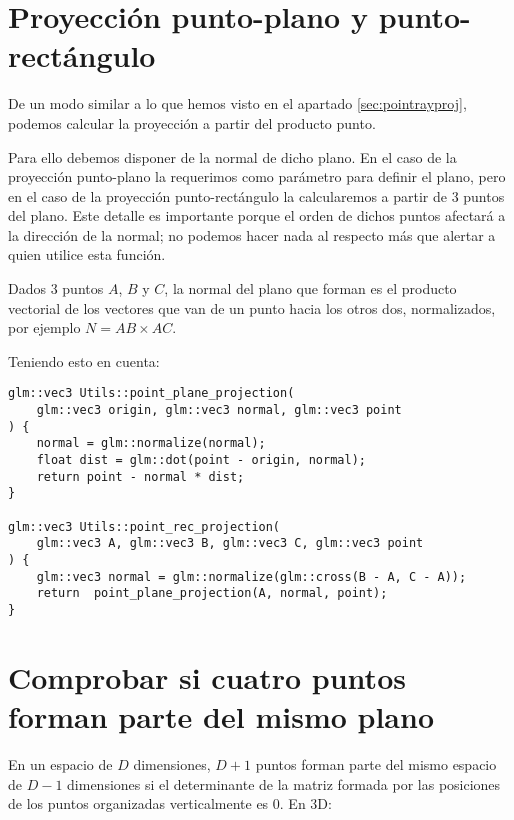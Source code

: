 \clearpage
\section{Proyección punto-plano y punto-rectángulo}
\label{sec:pointplaneproj}
De un modo similar a lo que hemos visto en el apartado \ref{sec:pointrayproj}, podemos calcular la proyección a partir del producto punto.

Para ello debemos disponer de la normal de dicho plano. En el caso de la proyección punto-plano la requerimos como parámetro para definir el plano, pero en el caso de la proyección punto-rectángulo la calcularemos a partir de 3 puntos del plano. Este detalle es importante porque el orden de dichos puntos afectará a la dirección de la normal; no podemos hacer nada al respecto más que alertar a quien utilice esta función.

Dados 3 puntos $A$, $B$ y $C$, la normal del plano que forman es el producto vectorial de los vectores que van de un punto hacia los otros dos, normalizados, por ejemplo $N = AB \times AC$.

Teniendo esto en cuenta:
\begin{lstlisting}
glm::vec3 Utils::point_plane_projection(
    glm::vec3 origin, glm::vec3 normal, glm::vec3 point
) {
	normal = glm::normalize(normal);
	float dist = glm::dot(point - origin, normal);
	return point - normal * dist;
}

glm::vec3 Utils::point_rec_projection(
    glm::vec3 A, glm::vec3 B, glm::vec3 C, glm::vec3 point
) {
	glm::vec3 normal = glm::normalize(glm::cross(B - A, C - A));
	return  point_plane_projection(A, normal, point);
}
\end{lstlisting}


\section{Comprobar si cuatro puntos forman parte del mismo plano}
\label{sec:check4pointplane}
En un espacio de $D$ dimensiones, $D+1$ puntos forman parte del mismo espacio de $D-1$ dimensiones si el determinante de la matriz formada por las posiciones de los puntos organizadas verticalmente es 0. En 3D:

